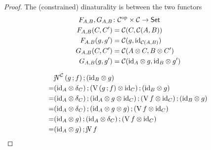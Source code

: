 \documentclass[runningheads,envcountsame]{llncs}
\begin{document}
\begin{proof}
    The (constrained) dinaturality is between the two functors
    \begin{align}
        F_{A,B}, G_{A,B}&\colon \op{\C} \times \C \to \Set \\
        F_{A,B}(C, C') &= \C(C, \homC{A}{B}) \\
        F_{A.B}(g, g') &= \C(g, \id_{\homC{A}{B}}) \\
        G_{A,B}(C, C') &= \C(\tensor{A}{C}, \tensor{B}{C'}) \\
        G_{A,B}(g, g') &= \C(\tensor{\id_A}{g}, \tensor{\id_B}{g'})
    \end{align}
    
    \begin{align}
        & \comp{\juncurry[\C]\,(\comp{g}{f})}{(\tensor{\id_B}{g})} \\
      = & \comp{\comp{(\tensor{\id_A}{\dup_C})}{(\tensor{\uncurry\,(\comp{g}{f})}{\id_C})}}{(\tensor{\id_B}{g})} \\
      = & \comp{\comp{(\tensor{\id_A}{\dup_C})}{\comp{(\tensor{\tensor{\id_A}{g}}{\id_C})}{(\tensor{\uncurry\,f}}{\id_C})}}{(\tensor{\id_B}{g})} \\
      = & \comp{\comp{(\tensor{\id_A}{\dup_C})}{(\tensor{\id_A}{\tensor{g}{g}})}}{(\tensor{\uncurry\,f}{\id_C})} \\
      = & \comp{(\tensor{\id_A}{g})}{\comp{(\tensor{\id_A}{\dup_C})}{(\tensor{\uncurry\,f}{\id_C})}} \\
      = & \comp{(\tensor{\id_A}{g})}{\juncurry\,f}
    \end{align}
\end{proof}
\end{document}

